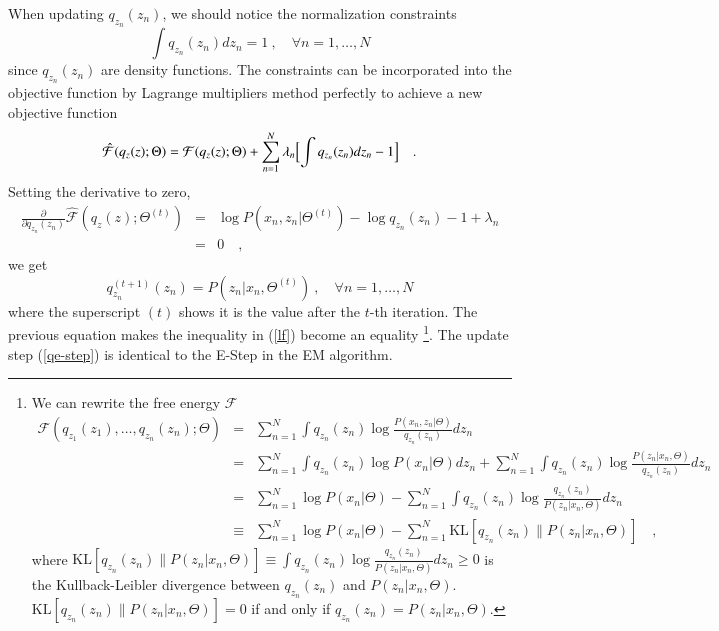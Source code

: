 \documentclass{article}
\begin{document}
When updating $q_{z_n}(z_n)$, we should notice the normalization constraints
\begin{equation}
\int q_{z_n}(z_n) dz_n = 1 \ , \quad\forall n = 1,\ldots,N
\end{equation}
since $q_{z_n}(z_n)$ are density functions.  The constraints can be incorporated into
the objective function by Lagrange multipliers method perfectly to achieve a new objective function
\begin{equation}
\hat{\mathcal{F}}(q_z(z);\Theta) = \mathcal{F}(q_z(z);\Theta)
+ \sum^N_{n=1} \lambda_n \Bigl[ \int q_{z_n}(z_n) dz_n - 1 \Bigr ] \quad .
\end{equation}
Setting the derivative to zero,
\begin{eqnarray}
\frac{\partial}{\partial q_{z_n}(z_n)} \hat{\mathcal{F}}(q_z(z);\Theta^{(t)})
&=& \log P(x_n,z_n|\Theta^{(t)}) - \log q_{z_n}(z_n) - 1 + \lambda_n \\
&=& 0 \quad ,
\end{eqnarray}
we get
\begin{equation}\label{qe-step}
q_{z_n}^{(t+1)}(z_n) = P(z_n|x_n, \Theta^{(t)}) \ , \quad\forall n = 1,\ldots,N
\end{equation}
where the superscript $(t)$ shows it is the value after the $t$-th iteration.
The previous equation makes the inequality in (\ref{lf}) become an equality
\footnote{
We can rewrite the free energy $\mathcal{F}$
\begin{eqnarray}
\mathcal{F}(q_{z_1}(z_1),\ldots,q_{z_n}(z_n);\Theta)
&=& \sum^N_{n=1} \int q_{z_n}(z_n) \log\frac{P(x_n,z_n|\Theta)}{q_{z_n}(z_n)}dz_n \nonumber\\
&=& \sum^N_{n=1} \int q_{z_n}(z_n) \log P(x_n|\Theta)dz_n +
\sum^N_{n=1} \int q_{z_n}(z_n) \log\frac{P(z_n|x_n,\Theta)}{q_{z_n}(z_n)}dz_n \nonumber\\
&=& \sum^N_{n=1} \log P(x_n|\Theta) -
\sum^N_{n=1} \int q_{z_n}(z_n) \log\frac{q_{z_n}(z_n)}{P(z_n|x_n,\Theta)}dz_n \nonumber\\
&\equiv& \sum^N_{n=1} \log P(x_n|\Theta) - \sum^N_{n=1} \text{KL}[q_{z_n}(z_n)\parallel P(z_n|x_n,\Theta)] \nonumber\quad,
\end{eqnarray}
where $\text{KL}[q_{z_n}(z_n)\parallel P(z_n|x_n,\Theta)]
\equiv\int q_{z_n}(z_n) \log\frac{q_{z_n}(z_n)}{P(z_n|x_n,\Theta)}dz_n\geq 0$ is the Kullback-Leibler divergence
between $q_{z_n}(z_n)$ and $P(z_n|x_n,\Theta)$.
$\text{KL}[q_{z_n}(z_n)\parallel P(z_n|x_n,\Theta)]=0$ if and only if $q_{z_n}(z_n)=P(z_n|x_n,\Theta)$.
}.
The update step (\ref{qe-step}) is identical to the E-Step in the EM algorithm.
\end{document}
